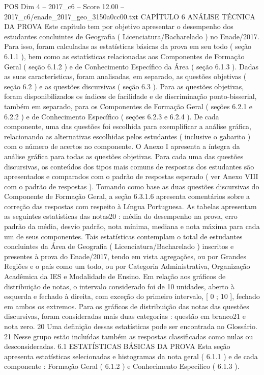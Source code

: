 \begin{textsample}{POS Dim 4 – 2017\_c6 – Score 12.00 – 2017\_c6/enade\_2017\_geo\_3150a0cc00.txt}  \label{ex:f4_pos_031}
CAPÍTULO 6 ANÁLISE TÉCNICA DA PROVA Este capítulo tem por objetivo apresentar o desempenho dos estudantes concluintes de Geografia ( Licenciatura/Bacharelado ) no Enade/2017.
Para isso, foram calculadas as estatísticas básicas da prova em seu todo ( seção 6.1.1 ), bem como as estatísticas relacionadas aos Componentes de Formação Geral ( seção 6.1.2 ) e de Conhecimento Específico da Área ( seção 6.1.3 ).
Dadas as suas características, foram analisadas, em separado, as questões objetivas ( seção 6.2 ) e as questões discursivas ( seção 6.3 ).
Para as questões objetivas, foram disponibilizados os índices de facilidade e de discriminação ponto-bisserial, também em separado, para os Componentes de Formação Geral ( seções 6.2.1 e 6.2.2 ) e de Conhecimento Específico ( seções 6.2.3 e 6.2.4 ).
De cada componente, uma das questões foi escolhida para exemplificar a análise gráfica, relacionando as alternativas escolhidas pelos estudantes ( inclusive o gabarito ) com o número de acertos no componente.
O Anexo I apresenta a íntegra da análise gráfica para todas as questões objetivas.
Para cada uma das questões discursivas, os conteúdos dos tipos mais comuns de respostas dos estudantes são apresentados e comparados com o padrão de respostas esperado ( ver Anexo VIII com o padrão de respostas ).
Tomando como base as duas questões discursivas do Componente de Formação Geral, a seção 6.3.1.6 apresenta comentários sobre a correção das respostas com respeito à Língua Portuguesa.
As tabelas apresentam as seguintes estatísticas das notas20 : média do desempenho na prova, erro padrão da média, desvio padrão, nota mínima, mediana e nota máxima para cada um de seus componentes.
Tais estatísticas contemplam o total de estudantes concluintes da Área de Geografia ( Licenciatura/Bacharelado ) inscritos e presentes à prova do Enade/2017, tendo em vista agregações, ou por Grandes Regiões e o país como um todo, ou por Categoria Administrativa, Organização Acadêmica da IES e Modalidade de Ensino.
Em relação aos gráficos de distribuição de notas, o intervalo considerado foi de 10 unidades, aberto à esquerda e fechado à direita, com exceção do primeiro intervalo, [ 0 ; 10 ], fechado em ambos os extremos.
Para os gráficos de distribuição das notas das questões discursivas, foram consideradas mais duas categorias : questão em branco21 e nota zero. 20 Uma definição dessas estatísticas pode ser encontrada no Glossário. 21 Nesse grupo estão incluídas também as respostas classificadas como nulas ou desconsideradas. 6.1 ESTATÍSTICAS BÁSICAS DA PROVA Esta seção apresenta estatísticas selecionadas e histogramas da nota geral ( 6.1.1 ) e de cada componente : Formação Geral ( 6.1.2 ) e Conhecimento Específico ( 6.1.3 ).

\end{textsample}
